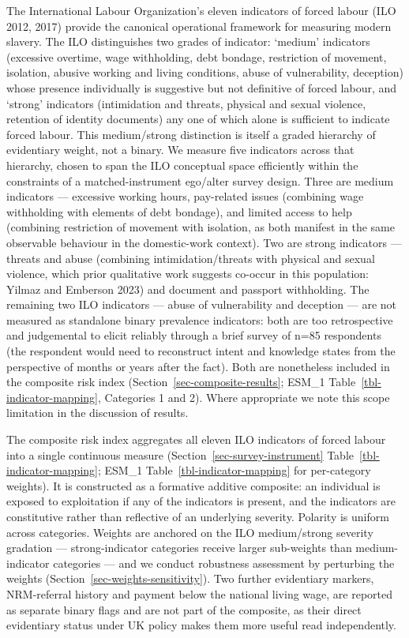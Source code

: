 \documentclass[
  12pt,
  letterpaper,
  DIV=11,
  numbers=noendperiod]{scrartcl}
\begin{document}
The International Labour Organization's eleven indicators of forced
labour (ILO 2012, 2017) provide the canonical operational framework for
measuring modern slavery. The ILO distinguishes two grades of indicator:
`medium' indicators (excessive overtime, wage withholding, debt bondage,
restriction of movement, isolation, abusive working and living
conditions, abuse of vulnerability, deception) whose presence
individually is suggestive but not definitive of forced labour, and
`strong' indicators (intimidation and threats, physical and sexual
violence, retention of identity documents) any one of which alone is
sufficient to indicate forced labour. This medium/strong distinction is
itself a graded hierarchy of evidentiary weight, not a binary. We
measure five indicators across that hierarchy, chosen to span the ILO
conceptual space efficiently within the constraints of a
matched-instrument ego/alter survey design. Three are medium indicators
--- excessive working hours, pay-related issues (combining wage
withholding with elements of debt bondage), and limited access to help
(combining restriction of movement with isolation, as both manifest in
the same observable behaviour in the domestic-work context). Two are
strong indicators --- threats and abuse (combining intimidation/threats
with physical and sexual violence, which prior qualitative work suggests
co-occur in this population: Yilmaz and Emberson 2023) and document and
passport withholding. The remaining two ILO indicators --- abuse of
vulnerability and deception --- are not measured as standalone binary
prevalence indicators: both are too retrospective and judgemental to
elicit reliably through a brief survey of n=85 respondents (the
respondent would need to reconstruct intent and knowledge states from
the perspective of months or years after the fact). Both are nonetheless
included in the composite risk index
(Section~\ref{sec-composite-results}; ESM\_1
Table~\ref{tbl-indicator-mapping}, Categories 1 and 2). Where
appropriate we note this scope limitation in the discussion of results.

The composite risk index aggregates all eleven ILO indicators of forced
labour into a single continuous measure
(Section~\ref{sec-survey-instrument} Table~\ref{tbl-indicator-mapping};
ESM\_1 Table~\ref{tbl-indicator-mapping} for per-category weights). It
is constructed as a formative additive composite: an individual is
exposed to exploitation if any of the indicators is present, and the
indicators are constitutive rather than reflective of an underlying
severity. Polarity is uniform across categories. Weights are anchored on
the ILO medium/strong severity gradation --- strong-indicator categories
receive larger sub-weights than medium-indicator categories --- and we
conduct robustness assessment by perturbing the weights
(Section~\ref{sec-weights-sensitivity}). Two further evidentiary
markers, NRM-referral history and payment below the national living
wage, are reported as separate binary flags and are not part of the
composite, as their direct evidentiary status under UK policy makes them
more useful read independently.
\end{document}
